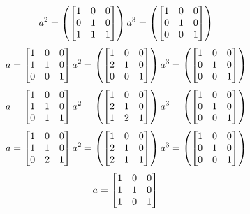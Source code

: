 \begin{mdframed}[style=darkAnswer,frametitle={Joe Starr}]
\begin{itemize}
{$$a^{ 2 }=\left( \begin{bmatrix}1&0&0\\0&1&0\\1&1&1\end{bmatrix} \right)
a^{ 3 }=\left( \begin{bmatrix}1&0&0\\0&1&0\\0&0&1\end{bmatrix} \right)
$$ $$
a= \begin{bmatrix}1&0&0\\1&1&0\\0&0&1\end{bmatrix} \\
a^{ 2 }=\left( \begin{bmatrix}1&0&0\\2&1&0\\0&0&1\end{bmatrix} \right)
a^{ 3 }=\left( \begin{bmatrix}1&0&0\\0&1&0\\0&0&1\end{bmatrix} \right)
$$ $$
a= \begin{bmatrix}1&0&0\\1&1&0\\0&1&1\end{bmatrix} \\
a^{ 2 }=\left( \begin{bmatrix}1&0&0\\2&1&0\\1&2&1\end{bmatrix} \right)
a^{ 3 }=\left( \begin{bmatrix}1&0&0\\0&1&0\\0&0&1\end{bmatrix} \right)
$$ $$
a= \begin{bmatrix}1&0&0\\1&1&0\\0&2&1\end{bmatrix} \\
a^{ 2 }=\left( \begin{bmatrix}1&0&0\\2&1&0\\2&1&1\end{bmatrix} \right)
a^{ 3 }=\left( \begin{bmatrix}1&0&0\\0&1&0\\0&0&1\end{bmatrix} \right)
$$ $$
a= \begin{bmatrix}1&0&0\\1&1&0\\1&0&1\end{bmatrix} \\
$$}
\end{itemize}
\end{mdframed}
